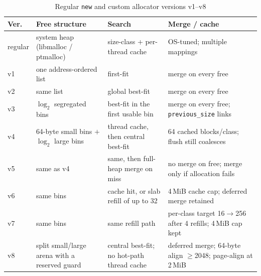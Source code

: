 \begin{table}[H]
\centering
\caption{Regular \texttt{new} and custom allocator versions v1--v8}
\label{tab:allocator-versions}
\footnotesize
\begin{tabularx}{\textwidth}{@{}l L L L@{}}
\toprule
Ver. & Free structure & Search & Merge / cache \\
\midrule
regular & system heap (libmalloc / ptmalloc) & size-class + per-thread cache & OS-tuned; multiple mappings \\
v1 & one address-ordered list & first-fit & merge on every free \\
v2 & same list & global best-fit & merge on every free \\
v3 & $\log_2$ segregated bins & best-fit in the first usable bin & merge on every free; \texttt{previous\_size} links \\
v4 & 64-byte small bins $+$ $\log_2$ large bins & thread cache, then central best-fit & 64 cached blocks/class; flush still coalesces \\
v5 & same as v4 & same, then full-heap merge on miss & no merge on free; merge only if allocation fails \\
v6 & same bins & cache hit, or slab refill of up to 32 & 4\,MiB cache cap; deferred merge retained \\
v7 & same bins & same refill path & per-class target 16$\rightarrow$256 after 4 refills; 4\,MiB cap kept \\
v8 & split small/large arena with a reserved guard & central best-fit; no hot-path thread cache & deferred merge; 64-byte align $\ge$2048; page-align at 2\,MiB \\
\bottomrule
\end{tabularx}
\end{table}
